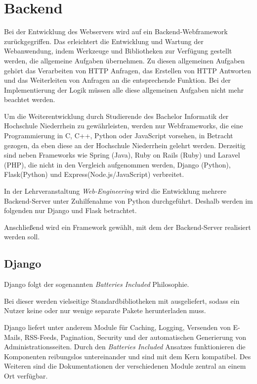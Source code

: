 \section{Backend} \label{sec:Backend}
Bei der Entwicklung des Webservers wird auf ein Backend-Webframework zurückgegriffen. Das erleichtert die Entwicklung und Wartung der Webanwendung, indem Werkzeuge und Bibliotheken zur Verfügung gestellt werden, die allgemeine Aufgaben übernehmen. Zu diesen allgemeinen Aufgaben gehört das Verarbeiten von HTTP Anfragen, das Erstellen von HTTP Antworten und das Weiterleiten von Anfragen an die entsprechende Funktion. Bei der Implementierung der Logik müssen alle diese allgemeinen Aufgaben nicht mehr beachtet werden.

Um die Weiterentwicklung durch Studierende des Bachelor Informatik der Hochschule Niederrhein zu gewährleisten, werden nur Webframeworks, die eine Programmierung in C, C++, Python oder JavaScript vorsehen, in Betracht gezogen, da eben diese an der Hochschule Niederrhein gelehrt werden. Derzeitig sind neben Frameworks wie Spring (Java), Ruby on Rails (Ruby) und Laravel (PHP), die nicht in den Vergleich aufgenommen werden, Django (Python), Flask(Python) und Express(Node.js/JavaScript) verbreitet. \cite{mdncontributorsServersideWebFrameworks2020}

In der Lehrveranstaltung \textit{Web-Engineering} wird die Entwicklung mehrere Backend-Server unter Zuhilfenahme von Python durchgeführt. Deshalb werden im folgenden nur Django und Flask betrachtet. 

Anschließend wird ein Framework gewählt, mit dem der Backend-Server realisiert werden soll.

\subsection{Django}\label{subsec:Django}
Django folgt der sogenannten \textit{Batteries Included} Philosophie. 

Bei dieser werden vielseitige Standardbibliotheken mit ausgeliefert, sodass ein Nutzer keine oder nur wenige separate Pakete herunterladen muss. \cite{kuchlingPEP206Python}

Django liefert unter anderem Module für Caching, Logging, Versenden von E-Mails, RSS-Feeds, Pagination, Security und der automatischen Generierung von Administrationsseiten. \cite{djangoDjangoDocumentationDjango} Durch den \textit{Batteries Included} Ansatzes funktionieren die Komponenten reibungslos untereinander und sind mit dem Kern kompatibel. Des Weiteren sind die Dokumentationen der verschiedenen Module zentral an einem Ort verfügbar. 

